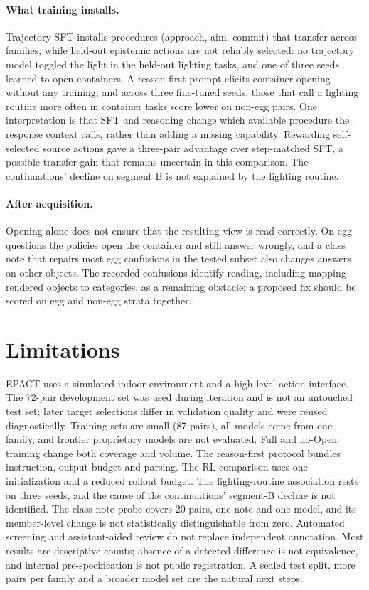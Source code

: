\documentclass{article}
\begin{document}
\paragraph{What training installs.} Trajectory SFT installs procedures (approach, aim, commit) that transfer across families, while held-out epistemic actions are not reliably selected: no trajectory model toggled the light in the held-out lighting tasks, and one of three seeds learned to open containers. A reason-first prompt elicits container opening without any training, and across three fine-tuned seeds, those that call a lighting routine more often in container tasks score lower on non-egg pairs. One interpretation is that SFT and reasoning change which available procedure the response context calls, rather than adding a missing capability. Rewarding self-selected source actions gave a three-pair advantage over step-matched SFT, a possible transfer gain that remains uncertain in this comparison. The continuations' decline on segment B is not explained by the lighting routine.

\paragraph{After acquisition.} Opening alone does not ensure that the resulting view is read correctly. On egg questions the policies open the container and still answer wrongly, and a class note that repairs most egg confusions in the tested subset also changes answers on other objects. The recorded confusions identify reading, including mapping rendered objects to categories, as a remaining obstacle; a proposed fix should be scored on egg and non-egg strata together.

\section{Limitations}
EPACT uses a simulated indoor environment and a high-level action interface. The 72-pair development set was used during iteration and is not an untouched test set; later target selections differ in validation quality and were reused diagnostically. Training sets are small (87 pairs), all models come from one family, and frontier proprietary models are not evaluated. Full and no-Open training change both coverage and volume. The reason-first protocol bundles instruction, output budget and parsing. The RL comparison uses one initialization and a reduced rollout budget. The lighting-routine association rests on three seeds, and the cause of the continuations' segment-B decline is not identified. The class-note probe covers 20 pairs, one note and one model, and its member-level change is not statistically distinguishable from zero. Automated screening and assistant-aided review do not replace independent annotation. Most results are descriptive counts; absence of a detected difference is not equivalence, and internal pre-specification is not public registration. A sealed test split, more pairs per family and a broader model set are the natural next steps.
\end{document}
